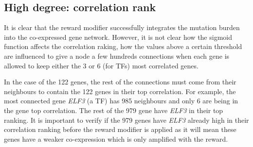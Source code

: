 \subsection{High degree: correlation rank} \label{s:N_II:corr_rank}




It is clear that the reward modifier successfully integrates the mutation burden into the co-expressed gene network. However, it is not clear how the sigmoid function affects the correlation raking, how the values above a certain threshold are influenced to give a node a few hundreds connections when each gene is allowed to keep either the 3 or 6 (for TFs) most correlated genes.

In the case of the 122 genes, the rest of the connections must come from their neighbours to contain the 122 genes in their top correlation. For example, the most connected gene \textit{ELF3} (a TF) has 985 neighbours and only 6 are being in the gene top correlation. The rest of the 979 gene have \textit{ELF3} in their top ranking. It is important to verify if the 979 genes have \textit{ELF3} already high in their correlation ranking before the reward modifier is applied as it will mean these genes have a weaker co-expression which is only amplified with the reward.

